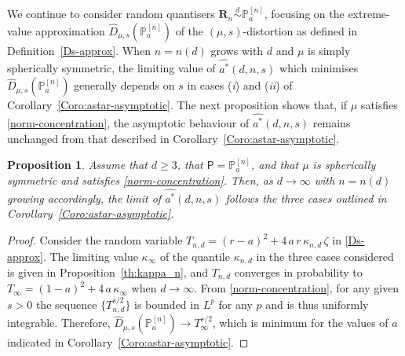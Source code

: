 \documentclass{article}
\def\Px{\mathsf{P}}
\def\Ex{\mathsf{E}}
\def\simd{\stackrel{d}{\sim}}
\def\ms{\sigma}
\def\PP{\mathbb{P}}
\def\SB{{\mathscr B}}
\def\SS{{\mathcal S}}
\newcommand{\bea}{\begin{eqnarray*}}
\newcommand{\eea}{\end{eqnarray*}}
\def\Rb{\mathbf{R}}
\def\dd{\mbox{\rm d}}
\newtheorem{proposition}{Proposition}[section]
\begin{document}
We continue to consider random quantisers $\Rb_n\simd\PP_a^{[n]}$, focusing on the extreme-value approximation $\widehat D_{\mu,s}(\PP_a^{[n]})$ of the $(\mu,s)$-distortion as defined in Definition~\ref{Ds-approx}. When $n=n(d)$ grows with $d$ and $\mu$ is simply spherically symmetric, the limiting value of $\widehat {a^*}(d,n,s)$ which minimises $\widehat D_{\mu,s}(\PP_a^{[n]})$  generally depends on $s$ in cases (\textit{i}) and (\textit{ii}) of Corollary~\ref{Coro:astar-asymptotic}.  The next proposition shows that, if $\mu$ satisfies \eqref{norm-concentration}, the asymptotic behaviour of $\widehat{a^*}(d,n,s)$ remains unchanged from that described in Corollary~\ref{Coro:astar-asymptotic}.

\begin{proposition} \label{Prop:extreme-value-general-mu}
Assume that $d\geq 3$, that $\Px=\PP_a^{[n]}$, and that $\mu$ is spherically symmetric and satisfies \eqref{norm-concentration}. Then, as $d \to \infty$ with $n = n(d)$ growing accordingly, the limit of $\widehat{a^*}(d,n,s)$ follows the three cases outlined in Corollary~\ref{Coro:astar-asymptotic}.
\end{proposition}

\begin{proof} Consider the random variable $T_{n,d}=(r-a)^2 + 4\,a\,r\,\kappa_{n,d}\,\zeta$ in \eqref{Ds-approx}. The limiting value $\kappa_\infty$ of the quantile $\kappa_{n,d}$ in the three cases considered is given in Proposition~\ref{th:kappa_n}, and $T_{n,d}$ converges in probability to $T_\infty=(1-a)^2 + 4\,a\,\kappa_\infty$ when $d\to\infty$. From \eqref{norm-concentration}, for any given $s>0$ the sequence $\{T_{n,d}^{s/2}\}$ is bounded in $L^p$ for any $p$ and is thus uniformly integrable. Therefore, $\widehat D_{\mu,s}(\PP_a^{[n]})\to T_\infty^{s/2}$, which is minimum for the values of $a$ indicated in Corollary~\ref{Coro:astar-asymptotic}.
\end{proof}


\end{document}
